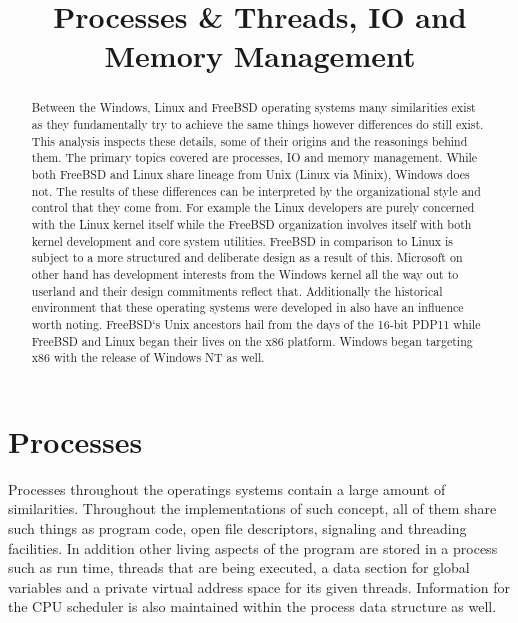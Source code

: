 \documentclass[letterpaper,10pt,draftclsnofoot,onecolumn]{IEEEtran}
\begin{document}
\title{Processes & Threads, IO and Memory Management}

\author{
}

\maketitle
\begin{abstract}
Between the Windows, Linux and FreeBSD operating systems many similarities exist as they fundamentally try to achieve the same things however differences do still exist. This analysis inspects these details, some of their origins and the reasonings behind them. The primary topics covered are processes, IO and memory management. While both FreeBSD and Linux share lineage from Unix (Linux via Minix), Windows does not. The results of these differences can be interpreted by the organizational style and control that they come from. For example the Linux developers are purely concerned with the Linux kernel itself while the FreeBSD organization involves itself with both kernel development and core system utilities. FreeBSD in comparison to Linux is subject to a more structured and deliberate design as a result of this. Microsoft on other hand has development interests from the Windows kernel all the way out to userland and their design commitments reflect that. Additionally the historical environment that these operating systems were developed in also have an influence worth noting. FreeBSD`s Unix ancestors hail from the days of the 16-bit PDP11 while FreeBSD and Linux began their lives on the x86 platform. Windows began targeting x86 with the release of Windows NT as well.
\end{abstract}
\pagebreak

\tableofcontents
\pagebreak
\section{Processes}
Processes throughout the operatings systems contain a large amount of similarities. Throughout the implementations of such concept, all of them share such things as program code, open file descriptors, signaling and threading facilities. In addition other living aspects of the program are stored in a process such as run time, threads that are being executed, a data section for global variables and a private virtual address space for its given threads. Information for the CPU scheduler is also maintained within the process data structure as well.\\
\end{document}
